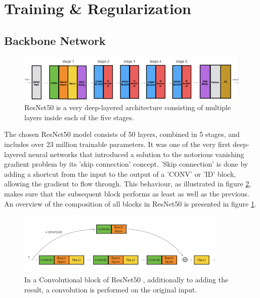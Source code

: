 \section{Training \& Regularization}
\subsection{Backbone Network}

\begin{figure}[H]
  \begin{center}
  \includegraphics[angle=0, width=1.0\textwidth]{Figures/resnet50.png}
  \caption{ResNet50 \citep{Dwivedi:2019:ResNetInKeras} is a very deep-layered architecture consisting of multiple layers inside each of the five stages.}
  \label{fig:ResNet50Architecture}
  \end{center}
\end{figure}

The chosen ResNet50 model \citep{Dwivedi:2019:ResNetInKeras} consists of 50 layers, combined in 5 stages, and includes over 23 million trainable parameters. It was one of the very first deep-layered neural networks that introduced a solution to the notorious vanishing gradient problem by its 'skip connection' concept.
\newline\newline
'Skip connection' is done by adding a shortcut from the input to the output of a 'CONV' or 'ID' block, allowing the gradient to flow through. This behaviour, as illustrated in figure \ref{fig:ResNet50ConvBlock}, makes sure that the subsequent block performs as least as well as the previous. An overview of the composition of all blocks in ResNet50 is presented in figure \ref{fig:ResNet50Architecture}. 

\begin{figure}[H]
  \begin{center}
  \includegraphics[angle=0, width=0.9\textwidth]{Figures/ResNet50_ConvBlock.png}
  \caption{In a Convolutional block of ResNet50 \citep{Dwivedi:2019:ResNetInKeras}, additionally to adding the result, a convolution is performed on the original input.}
  \label{fig:ResNet50ConvBlock}
  \end{center}
\end{figure}


